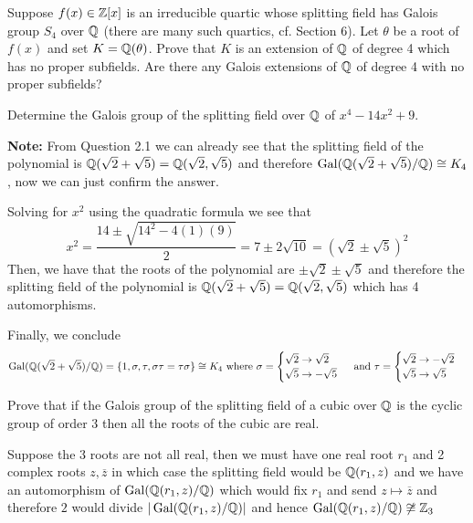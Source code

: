 \begin{unfinished}
    Suppose $f(x) \in \mathbb{Z}[x]$ is an irreducible quartic whose splitting field has Galois group $S_4$ over $\mathbb{Q}$ (there are many such quartics, cf. Section 6). Let $\theta$ be a root of $f(x)$ and set $K = \mathbb{Q}(\theta)$. Prove that $K$ is an extension of $\mathbb{Q}$ of degree 4 which has no proper subfields. Are there any Galois extensions of $\mathbb{Q}$ of degree 4 with no proper subfields?
\end{unfinished}

\begin{exercise}
    Determine the Galois group of the splitting field over $\mathbb{Q}$ of $x^4 - 14x^2 + 9$.
\end{exercise}
\begin{solution}
    \textbf{Note:} From Question 2.1 we can already see that the splitting field of the polynomial is $\mathbb{Q}(\sqrt{2} + \sqrt{5}) = \mathbb{Q}(\sqrt{2}, \sqrt{5})$ and therefore $\operatorname{Gal}(\mathbb{Q}(\sqrt{2} + \sqrt{5})/\mathbb{Q}) \cong K_4$, now we can just confirm the answer.
    
    \noindent Solving for $x^2$ using the quadratic formula we see that \[x^2 = \frac{14 \pm \sqrt{14^2-4(1)(9)}}{2} = 7 \pm 2\sqrt{10} = (\sqrt{2} \pm \sqrt{5})^2\]
    Then, we have that the roots of the polynomial are $\pm \sqrt{2} \pm \sqrt{5}$ and therefore the splitting field of the polynomial is $\mathbb{Q}(\sqrt{2} + \sqrt{5}) = \mathbb{Q}(\sqrt{2}, \sqrt{5})$ which has 4 automorphisms. 
    
    Finally, we conclude \[\operatorname{Gal}(\mathbb{Q}(\sqrt{2} + \sqrt{5})/\mathbb{Q}) = \{1, \sigma, \tau, \sigma\tau = \tau\sigma\} \cong K_4 \text{ where } \sigma = \begin{cases}
        \sqrt{2} \to \sqrt{2} \\
        \sqrt{5} \to -\sqrt{5}
    \end{cases} \text{ and } \tau = \begin{cases}
        \sqrt{2} \to -\sqrt{2} \\
        \sqrt{5} \to \sqrt{5}
    \end{cases}\]
\end{solution}

\begin{exercise}
    Prove that if the Galois group of the splitting field of a cubic over $\mathbb{Q}$ is the cyclic group of order 3 then all the roots of the cubic are real.
\end{exercise}
\begin{solution}
    Suppose the 3 roots are not all real, then we must have one real root $r_1$ and 2 complex roots $z, \overline{z}$ in which case the splitting field would be $\mathbb{Q}(r_1, z)$ and we have an automorphism of $\operatorname{Gal}(\mathbb{Q}(r_1, z)/\mathbb{Q})$ which would fix $r_1$ and send $z \mapsto \overline{z}$ and therefore $2$ would divide $|\operatorname{Gal}(\mathbb{Q}(r_1,z)/\mathbb{Q})|$ and hence $\operatorname{Gal}(\mathbb{Q}(r_1,z)/\mathbb{Q}) \not\cong \mathbb{Z}_3$
\end{solution}

